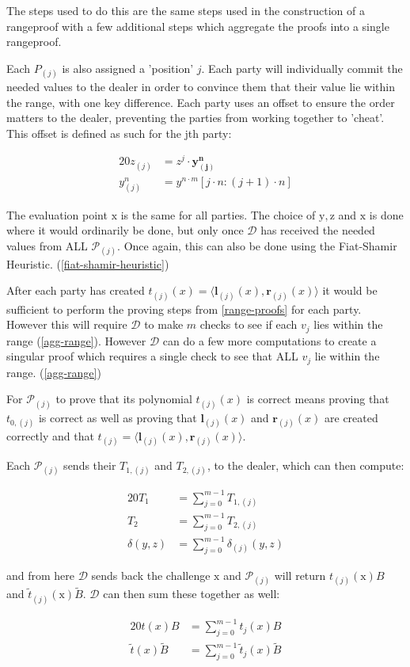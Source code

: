 \documentclass{article}
\newcommand{\eq}[1]{\begin{alignat*}{20}#1\end{alignat*}}
\renewcommand{\vec}[1]{\boldsymbol{#1}}
\newcommand{\ran}[1]{\mathrm{#1}}
\renewcommand{\P}{\mathcal{P}}
\newcommand{\D}{\mathcal{D}}
\newcommand{\dotp}[2]{\langle #1, #2 \rangle}
\newcommand{\tB}{\widetilde{B}}
\renewcommand{\tt}{\widetilde{t}}
\begin{document}
The steps used to do this are the same steps used in the construction
of a rangeproof with a few additional steps which aggregate the proofs
into a single rangeproof.

Each $P_{(j)}$ is
also assigned a 'position' $j$. Each party will individually commit
the needed values to the dealer in order to convince them that their
value lie within the range, with one key difference. Each party uses
an offset to ensure the order matters to the dealer, preventing the
parties from working together to 'cheat'. This offset is defined as
such for the jth party:

\eq{
	z_{(j)}   &= z^j \cdot \vec{y^n_{(j)}} \\
	y^n_{(j)} &= y^{n \cdot m}[j \cdot n:(j+1) \cdot n]
}

The evaluation point $\ran{x}$ is the same for all parties. The choice
of $\ran{y}, \ran{z}$ and $\ran{x}$ is done where it would ordinarily
be done, but only once $\D$ has received the needed values from ALL
$\P_{(j)}$. Once again, this can also be done using the Fiat-Shamir
Heuristic. (\ref{fiat-shamir-heuristic})

After each party has created $t_{(j)}(x) =
\dotp{\vec{l}_{(j)}(x)}{\vec{r}_{(j)}(x)}$ it would be sufficient
to perform the proving steps from \ref{range-proofs} for each
party. However this will require $\D$ to make $m$ checks to see if each
$v_j$ lies within the range (\ref{agg-range}). However $\D$ can do a
few more computations to create a singular proof which requires a single
check to see that ALL $v_j$ lie within the range. (\ref{agg-range})

For $\P_{(j)}$ to prove that its polynomial $t_{(j)}(x)$ is correct
means proving that $t_{0,(j)}$ is correct as well as proving that
$\vec{l}_{(j)}(x)$ and $\vec{r}_{(j)}(x)$ are created correctly and
that $t_{(j)} = \dotp{\vec{l}_{(j)}(x)}{\vec{r}_{(j)}(x)}$.

Each $\P_{(j)}$ sends their $T_{1,(j)}$ and $T_{2,(j)}$, to the dealer,
which can then compute:

\eq{
	T_1 &= \sum^{m-1}_{j = 0} T_{1,(j)}\\
	T_2 &= \sum^{m-1}_{j = 0} T_{2,(j)}\\
	\delta(y,z) &= \sum^{m-1}_{j = 0} \delta_{(j)}(y,z)
}

and from here $\D$ sends back the challenge
$\ran{x}$ and $\P_{(j)}$ will return $t_{(j)}(\ran{x})B$ and
$\tt_{(j)}(\ran{x})\tB$. $\D$ can then sum these
together as well:

\eq{
t(x)B &= \sum^{m-1}_{j = 0} t_{j}(x)B\\
\tt(x)\tB &= \sum^{m-1}_{j = 0} \tt_{j}(x)\tB
}
\end{document}
